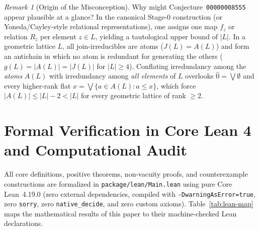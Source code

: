 \documentclass[11pt]{article}
\theoremstyle{definition}
\theoremstyle{remark}
\newtheorem{remark}[theorem]{Remark}
\begin{document}
\begin{remark}[Origin of the Misconception]
Why might Conjecture~\texttt{00000008555} appear plausible at a glance? In the canonical Stage-$0$ construction (or Yoneda/Cayley-style relational representations), one assigns one map $f_z$ or relation $R_z$ per element $z \in L$, yielding a tautological upper bound of $|L|$. In a geometric lattice $L$, all join-irreducibles are atoms ($J(L) = A(L)$) and form an antichain in which no atom is redundant for generating the others ($g(L) = |A(L)| = |J(L)|$ for $|L| \ge 4$). Conflating irredundancy among the \emph{atoms} $A(L)$ with irredundancy among \emph{all elements} of $L$ overlooks $\hat{0} = \bigvee \emptyset$ and every higher-rank flat $x = \bigvee \{a \in A(L) : a \le x\}$, which force $|A(L)| \le |L| - 2 < |L|$ for every geometric lattice of rank $\ge 2$.
\end{remark}

\section{Formal Verification in Core Lean 4 and Computational Audit}
\label{sec:lean}

All core definitions, positive theorems, non-vacuity proofs, and counterexample constructions are formalized in \texttt{package/lean/Main.lean} using pure Core Lean~4.19.0 (zero external dependencies, compiled with \texttt{-DwarningAsError=true}, zero \texttt{sorry}, zero \texttt{native\_decide}, and zero custom axioms). Table~\ref{tab:lean-map} maps the mathematical results of this paper to their machine-checked Lean declarations.
\end{document}
